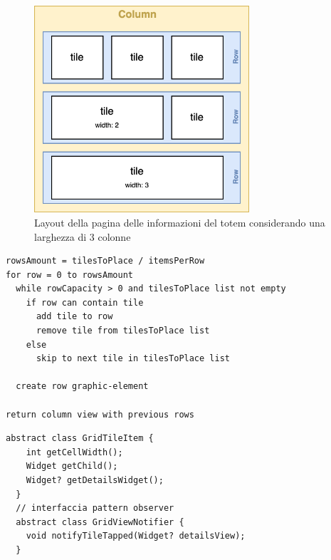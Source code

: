 \begin{figure}[h]
  \centering
  \includegraphics[width=8cm]{img/totem/infopage-layout.png}
  \caption[Layout pagina informazioni]{Layout della pagina delle informazioni del totem considerando una larghezza di 3 colonne}
  \label{fig:infopageLayout}
\end{figure}

\begin{lstlisting}[language=pseudocode, caption={Pseudocodice per la costruzione della griglia di Tiles con occupazione della riga variabile}, label={lst:gridTileViewClass}]
rowsAmount = tilesToPlace / itemsPerRow
for row = 0 to rowsAmount
  while rowCapacity > 0 and tilesToPlace list not empty
    if row can contain tile
      add tile to row
      remove tile from tilesToPlace list
    else 
      skip to next tile in tilesToPlace list

  create row graphic-element

return column view with previous rows
\end{lstlisting}

\begin{lstlisting}[style=FlutterStyle, caption={Interfacce GridTileItem e GridViewNotifier}, label={lst:gridTileItem}]
  abstract class GridTileItem {
    int getCellWidth();
    Widget getChild();
    Widget? getDetailsWidget();
  }
  // interfaccia pattern observer
  abstract class GridViewNotifier {
    void notifyTileTapped(Widget? detailsView);
  }
  \end{lstlisting}

